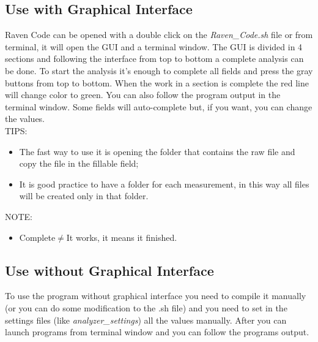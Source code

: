 \documentclass[a4paper,12pt]{article}
\begin{document}
		\subsection{Use with Graphical Interface} 
			Raven Code can be opened with a double click on the \textit{Raven\_Code.sh} file or from terminal, it will open the GUI and a terminal window.
			The GUI is divided in 4 sections and following the interface from top to bottom a complete analysis can be done.
			To start the analysis it's enough to complete all fields and press the gray buttons from top to bottom.
			When the work in a section is complete the red line will change color to green.
			You can also follow the program output in the terminal window.
			Some fields will auto-complete but, if you want, you can change the values.\\
			TIPS:
			\begin{itemize}
			 	\item The fast way to use it is opening the folder that contains the raw file and copy the file in the fillable field;
			 	\item It is good practice to have a folder for each measurement, in this way all files will be created only in that folder.
			 \end{itemize} 
			NOTE: 
			\begin{itemize}
				\item Complete$\neq$It works, it means it finished.
			\end{itemize} 
		\subsection{Use without Graphical Interface} 
			To use the program without graphical interface you need to compile it manually (or you can do some modification to the .sh file) and you need to set in the settings files (like \textit{analyzer\_settings}) all the values manually.
			After you can launch programs from terminal window and you can follow the programs output.
\end{document}
